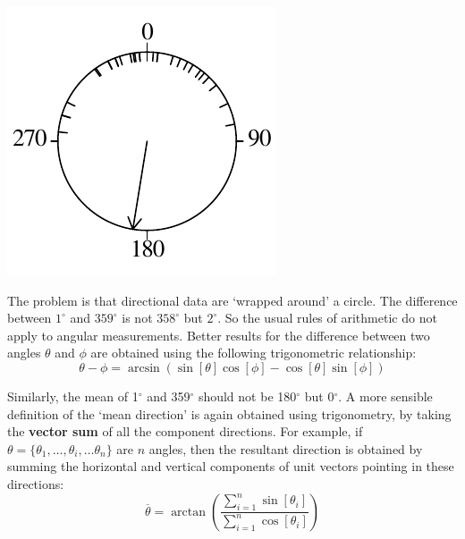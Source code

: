 \noindent\begin{minipage}[t][][b]{.2\textwidth}
\includegraphics[width=\textwidth]{../figures/circle2.pdf}\medskip
\end{minipage}
\begin{minipage}[t][][t]{.8\textwidth}
  \label{fig:circle2}
\end{minipage}

The problem is that directional data are `wrapped around' a circle.
The difference between $1^{\circ}$ and $359^{\circ}$ is not
$358^{\circ}$ but $2^{\circ}$. So the usual rules of arithmetic do not
apply to angular measurements. Better results for the difference
between two angles $\theta$ and $\phi$ are obtained using the
following trigonometric relationship:
\begin{equation}
  \theta - \phi = \arcsin\left( \sin[\theta] \cos[\phi] -
                                \cos[\theta] \sin[\phi] \right)
  \label{eq:anglediff}
\end{equation}

Similarly, the mean of 1$^\circ$ and 359$^\circ$ should not be
180$^\circ$ but 0$^\circ$. A more sensible definition of the `mean
direction' is again obtained using trigonometry, by taking the
\textbf{vector sum} of all the component directions. For example, if
$\theta = \{\theta_1, \ldots, \theta_i, \ldots \theta_n \}$ are $n$
angles, then the resultant direction is obtained by summing the
horizontal and vertical components of unit vectors pointing in these
directions:
\begin{equation}
  \overline{\theta} = \arctan\left(\frac{\sum_{i=1}^{n}
    \sin[\theta_i]}{\sum_{i=1}^{n}\cos[\theta_i]} \right)
  \label{eq:averagedirection}
\end{equation}

